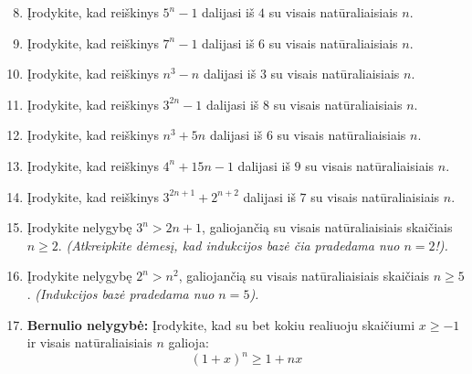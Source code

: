 \documentclass[11pt,a4paper]{scrartcl}
\begin{document}
\begin{enumerate}
    \setcounter{enumi}{7}
    \item Įrodykite, kad reiškinys $5^n - 1$ dalijasi iš $4$ su visais natūraliaisiais $n$.
    
    \item Įrodykite, kad reiškinys $7^n - 1$ dalijasi iš $6$ su visais natūraliaisiais $n$.
    
    \item Įrodykite, kad reiškinys $n^3 - n$ dalijasi iš $3$ su visais natūraliaisiais $n$.
    
    \item Įrodykite, kad reiškinys $3^{2n} - 1$ dalijasi iš $8$ su visais natūraliaisiais $n$. 

    
    \item Įrodykite, kad reiškinys $n^3 + 5n$ dalijasi iš $6$ su visais natūraliaisiais $n$.
    
    \item Įrodykite, kad reiškinys $4^n + 15n - 1$ dalijasi iš $9$ su visais natūraliaisiais $n$.
    
    \item Įrodykite, kad reiškinys $3^{2n+1} + 2^{n+2}$ dalijasi iš $7$ su visais natūraliaisiais $n$.
\end{enumerate}

\begin{enumerate}
    \setcounter{enumi}{14}
    \item Įrodykite nelygybę $3^n > 2n + 1$, galiojančią su visais natūraliaisiais skaičiais $n \ge 2$. \textit{(Atkreipkite dėmesį, kad indukcijos bazė čia pradedama nuo $n=2$!).}
    
    \item Įrodykite nelygybę $2^n > n^2$, galiojančią su visais natūraliaisiais skaičiais $n \ge 5$. \textit{(Indukcijos bazė pradedama nuo $n=5$).}
    
    \item \textbf{Bernulio nelygybė:} Įrodykite, kad su bet kokiu realiuoju skaičiumi $x \ge -1$ ir visais natūraliaisiais $n$ galioja:
    $$ (1+x)^n \ge 1 + nx $$
\end{enumerate}
\end{document}
